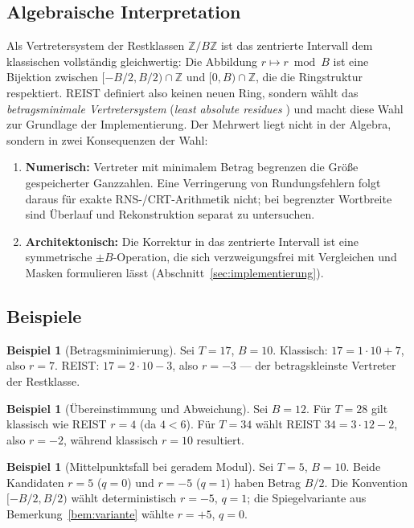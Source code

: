 \documentclass[11pt,a4paper]{scrartcl}
\theoremstyle{definition}
\newtheorem{beispiel}[definition]{Beispiel}
\theoremstyle{plain}
\theoremstyle{remark}
\newcommand{\Z}{\mathbb{Z}}
\begin{document}
\subsection{Algebraische Interpretation}

Als Vertretersystem der Restklassen $\Z/B\Z$ ist das zentrierte Intervall dem klassischen vollständig gleichwertig: Die Abbildung $r \mapsto r \bmod B$ ist eine Bijektion zwischen $[-B/2, B/2) \cap \Z$ und $[0, B) \cap \Z$, die die Ringstruktur respektiert. REIST definiert also keinen neuen Ring, sondern wählt das \emph{betragsminimale Vertretersystem} (\emph{least absolute residues} \cite{niven}) und macht diese Wahl zur Grundlage der Implementierung. Der Mehrwert liegt nicht in der Algebra, sondern in zwei Konsequenzen der Wahl:
\begin{enumerate}
\item \textbf{Numerisch:} Vertreter mit minimalem Betrag begrenzen die Größe gespeicherter Ganzzahlen. Eine Verringerung von Rundungsfehlern folgt daraus für exakte RNS-/CRT-Arithmetik nicht; bei begrenzter Wortbreite sind Überlauf und Rekonstruktion separat zu untersuchen.
\item \textbf{Architektonisch:} Die Korrektur in das zentrierte Intervall ist eine symmetrische $\pm B$-Operation, die sich verzweigungsfrei mit Vergleichen und Masken formulieren lässt (Abschnitt~\ref{sec:implementierung}).
\end{enumerate}

\subsection{Beispiele}

\begin{beispiel}[Betragsminimierung]
Sei $T = 17$, $B = 10$. Klassisch: $17 = 1 \cdot 10 + 7$, also $r = 7$. REIST: $17 = 2 \cdot 10 - 3$, also $r = -3$ --- der betragskleinste Vertreter der Restklasse.
\end{beispiel}

\begin{beispiel}[Übereinstimmung und Abweichung]
Sei $B = 12$. Für $T = 28$ gilt klassisch wie REIST $r = 4$ (da $4 < 6$). Für $T = 34$ wählt REIST $34 = 3 \cdot 12 - 2$, also $r = -2$, während klassisch $r = 10$ resultiert.
\end{beispiel}

\begin{beispiel}[Mittelpunktsfall bei geradem Modul]
Sei $T = 5$, $B = 10$. Beide Kandidaten $r = 5$ ($q=0$) und $r = -5$ ($q=1$) haben Betrag $B/2$. Die Konvention $[-B/2, B/2)$ wählt deterministisch $r = -5$, $q = 1$; die Spiegelvariante aus Bemerkung~\ref{bem:variante} wählte $r = +5$, $q = 0$.
\end{beispiel}
\end{document}
